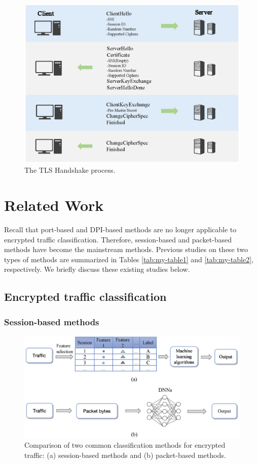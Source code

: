 \documentclass[preprint,12pt]{elsarticle}
\begin{document}
\begin{figure}[t]
\includegraphics[width=\textwidth]{TLShandshake.eps}
\caption{The TLS Handshake process.} \label{fig1}
\end{figure}





\section{Related Work}
Recall that port-based and DPI-based methods are no longer applicable to encrypted traffic classification. Therefore, session-based and packet-based methods have become the mainstream methods. Previous studies on these two types of methods are summarized in Tables \ref{tab:my-table1} and \ref{tab:my-table2}, respectively. We briefly discuss these existing studies below. 

\subsection{Encrypted traffic classification}

\subsubsection{Session-based methods}

\begin{figure}[!t]
\includegraphics[width=\textwidth]{compare.eps}
\caption{Comparison of two common classification methods for encrypted traffic: (a) session-based methods and (b) packet-based methods.} \label{fig2}
\end{figure}
\end{document}
